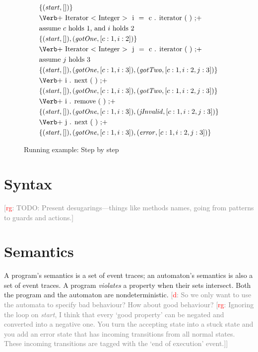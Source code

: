\documentclass[preprint]{sigplanconf} %
\newcommand{\note}[2]{\textcolor{gray}{[\textcolor{red}{#1}: #2]}}
\newcommand{\rg}[1]{\note{rg}{#1}}
\newcommand{\dd}[1]{\note{d}{#1}}
\newcommand{\dinocomment}[1]{\dd{#1}}
\theoremstyle{definition}
\begin{document}
\begin{figure}
\begin{align*}
&\{(\mathit{start}, [])\} \\
&\text{\Verb+\PY{n}{Iterator}\PY{o}{<}\PY{n}{Integer}\PY{o}{>} \PY{n}{i} \PY{o}{=} \PY{n}{c}\PY{o}{.}\PY{n+na}{iterator}\PY{o}{(}\PY{o}{)}\PY{o}{;}+} \\
&\text{assume $c$ holds $1$, and $i$ holds $2$ } \\
&\{(\mathit{start},[]), (\mathit{gotOne},[c:1, i:2])\} \\
&\text{\Verb+\PY{n}{Iterator}\PY{o}{<}\PY{n}{Integer}\PY{o}{>} \PY{n}{j} \PY{o}{=} \PY{n}{c}\PY{o}{.}\PY{n+na}{iterator}\PY{o}{(}\PY{o}{)}\PY{o}{;}+}\\
&\text{assume $j$ holds $3$} \\
&\{(\mathit{start},[]), (\mathit{gotOne},[c:1,i:3]),(\mathit{gotTwo},[c:1,i:2,j:3])\} \\
&\text{\Verb+\PY{n}{i}\PY{o}{.}\PY{n+na}{next}\PY{o}{(}\PY{o}{)}\PY{o}{;}+} \\
&\{(\mathit{start},[]), (\mathit{gotOne},[c:1,i:3]),(\mathit{gotTwo},[c:1,i:2,j:3])\}\\
&\text{\Verb+\PY{n}{i}\PY{o}{.}\PY{n+na}{remove}\PY{o}{(}\PY{o}{)}\PY{o}{;}+} \\
&\{(\mathit{start},[]), (\mathit{gotOne},[c:1,i:3]),(\mathit{jInvalid},[c:1,i:2,j:3])\} \\
&\text{\Verb+\PY{n}{j}\PY{o}{.}\PY{n+na}{next}\PY{o}{(}\PY{o}{)}\PY{o}{;}+}\\
&\{(\mathit{start},[]), (\mathit{gotOne},[c:1,i:3]), (\mathit{error},[c:1,i:2,j:3])\}
\end{align*}
\caption{Running example: Step by step}
\label{fig:running.steps}
\end{figure}

\section{Syntax}\label{sec:syntax} %

\rg{TODO: Present desugarings---things like methods names, going from patterns to guards and actions.}

\section{Semantics}\label{sec:semantics} %

A program's semantics is a set of event traces;
an automaton's semantics is also a set of event traces.
A program \emph{violates} a property when their sets intersect.
Both the program and the automaton are nondeterministic.
\dinocomment{So we only want to use the automata to specify bad behaviour?
How about good behaviour?
\rg{Ignoring the loop on \textit{start}, I think that every `good property' can be negated and converted into a negative one.
You turn the accepting state into a stuck state and you add an error state that has incoming transitions from all normal states.
These incoming transitions are tagged with the `end of execution' event.}}
\end{document}
